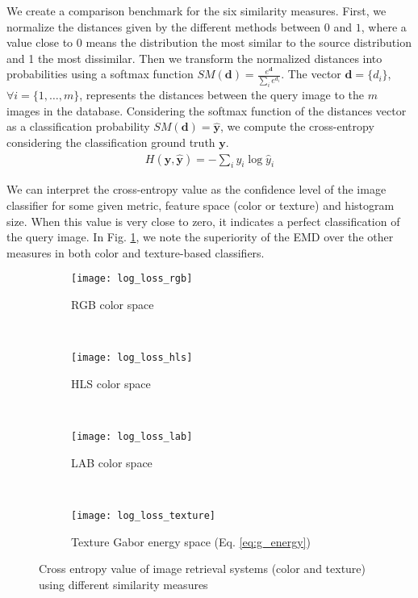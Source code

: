 We create a comparison benchmark for the six similarity measures. First, we normalize the distances given by the different methods between $0$ and $1$, where a value close to $0$ means the distribution the most similar to the source distribution and 1 the most dissimilar. Then we transform the normalized distances into probabilities using a softmax function $SM(\mathbf{d}) = \frac{e^{\mathbf{d}}}{\sum_{i}e^{d_i}}$. The vector $\mathbf{d}=\{d_i\}$, $\forall i=\{1, \ldots, m\}$, represents the distances between the query image to the $m$ images in the database. Considering the softmax function of the distances vector as a classification probability $SM(\mathbf{d})=\mathbf{\hat{y}}$,  we compute the cross-entropy \citep{Bishop:BOOK:2006} considering the classification ground truth $\mathbf{y}$. 
\begin{eqnarray}
H(\mathbf{y}, \mathbf{\hat{y}}) = - \sum\nolimits_{i}{y_i}\log \hat{y}_i
\label{eq:cross-entropy}
\end{eqnarray}

We can interpret the cross-entropy value as the confidence level of the image classifier for some given metric, feature space (color or texture) and histogram size. When this value is very close to zero, it indicates a perfect classification of the query image. In Fig. \ref{fig:cross_entropy}, we note the superiority of the EMD over the other measures in both color and texture-based classifiers.

\begin{figure}[ht]
    \centering
    \begin{subfigure}[b]{0.45\textwidth}
		\centering
		\texttt{[image: log\_loss\_rgb]}	
		\caption{RGB color space}
	\end{subfigure}
    ~ %
    \begin{subfigure}[b]{0.45\textwidth}
		\centering
		\texttt{[image: log\_loss\_hls]}	
		\caption{HLS color space}
	\end{subfigure}\\[2ex]
	
	
    \begin{subfigure}[b]{0.45\textwidth}
		\centering
		\texttt{[image: log\_loss\_lab]}	
		\caption{LAB color space}
	\end{subfigure}   
    ~ %
    \begin{subfigure}[b]{0.45\textwidth}
		\centering
		\texttt{[image: log\_loss\_texture]}	
		\caption{Texture Gabor energy space (Eq. \ref{eq:g_energy})}
	\end{subfigure}  
		
	\caption{Cross entropy value of image retrieval systems (color and texture) using different similarity measures}
	\label{fig:cross_entropy}
\end{figure}

